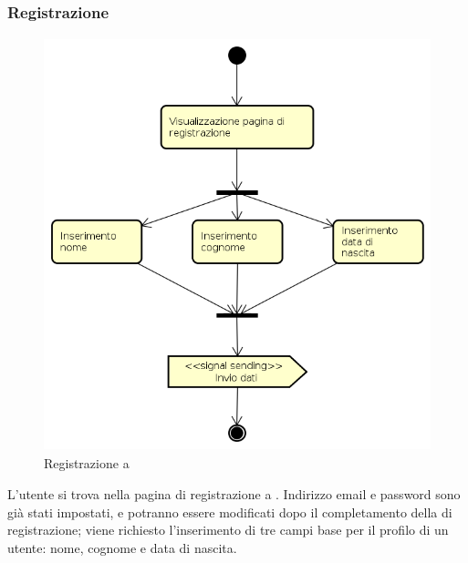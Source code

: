 \subsubsection{Registrazione}
\begin{figure}[H]
\begin{center}
\includegraphics[height=12cm]{res/sections/backend/activities/registrazione.png}
\caption{Registrazione a }
\end{center}
\end{figure}
L'utente si trova nella pagina di registrazione a . Indirizzo email e password sono già stati impostati, e potranno essere modificati dopo il completamento della  di registrazione; viene richiesto l'inserimento di tre campi base per il profilo di un utente: nome, cognome e data di nascita.
